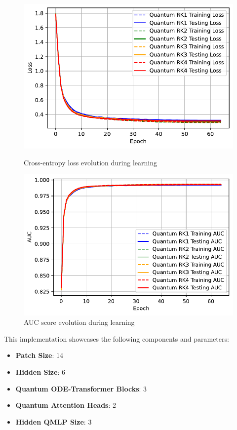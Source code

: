 \documentclass[12pt,a4paper]{report}
\begin{document}
\begin{figure}[th]
  \centering
  \includegraphics[scale=0.88]{./pics/new_pdf_graphs/quantum/3_rk_1_dec/quantum_transfomer_loss_mnist_rk1_rk2_rk3_rk4.pdf}
  \caption[Cross-entropy loss evolution during learning]{Cross-entropy loss evolution during learning}
  \label{fig:p22}
  \vspace*{\floatsep}
  \centering
  \includegraphics[scale=0.88]{./pics/new_pdf_graphs/quantum/3_rk_1_dec/quantum_transfomer_auc_mnist_rk1_rk2_rk3_rk4.pdf}
  \caption[AUC score evolution during learning]{AUC score evolution during learning}
  \label{fig:p23}
\end{figure}

This implementation showcases the following components and parameters:
\begin{itemize}
  \item \textbf{Patch Size}: 14
  \item \textbf{Hidden Size}: 6
  \item \textbf{Quantum ODE-Transformer Blocks}: 3
  \item \textbf{Quantum Attention Heads}: 2
  \item \textbf{Hidden QMLP Size}: 3
\end{itemize}
\end{document}

